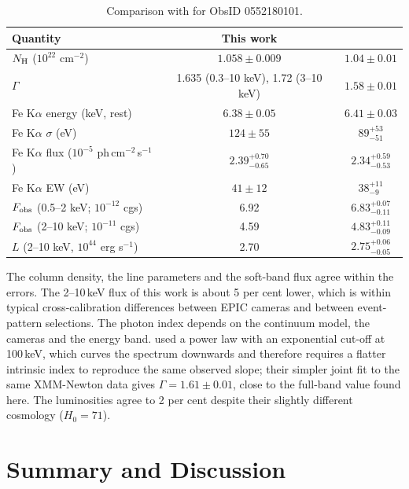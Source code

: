 \documentclass[11pt,a4paper]{article}
\newcommand{\nh}{N_{\rm H}}
\begin{document}
\begin{table}[H]
\centering
\caption{Comparison with \citet{ballo11} for ObsID 0552180101.}
\label{tab:comp}
\small
\begin{tabular}{lcc}
\toprule
Quantity & This work & \citet{ballo11} \\
\midrule
$\nh$ ($10^{22}$ cm$^{-2}$) & $1.058\pm0.009$ & $1.04\pm0.01$ \\
$\Gamma$ & 1.635 (0.3--10 keV), 1.72 (3--10 keV) & $1.58\pm0.01$ \\
Fe K$\alpha$ energy (keV, rest) & $6.38\pm0.05$ & $6.41\pm0.03$ \\
Fe K$\alpha$ $\sigma$ (eV) & $124\pm55$ & $89^{+53}_{-51}$ \\
Fe K$\alpha$ flux ($10^{-5}$ ph\,cm$^{-2}$\,s$^{-1}$) & $2.39^{+0.70}_{-0.65}$ & $2.34^{+0.59}_{-0.53}$ \\
Fe K$\alpha$ EW (eV) & $41\pm12$ & $38^{+11}_{-9}$ \\
$F_{\rm obs}$ (0.5--2 keV; $10^{-12}$ cgs) & 6.92 & $6.83^{+0.07}_{-0.11}$ \\
$F_{\rm obs}$ (2--10 keV; $10^{-11}$ cgs) & 4.59 & $4.83^{+0.11}_{-0.09}$ \\
$L$ (2--10 keV, $10^{44}$ erg s$^{-1}$) & 2.70 & $2.75^{+0.06}_{-0.05}$ \\
\bottomrule
\end{tabular}
\end{table}

The column density, the line parameters and the soft-band flux agree within the errors. The 2--10\,keV flux of this work is about 5 per cent lower, which is within typical cross-calibration differences between EPIC cameras and between event-pattern selections. The photon index depends on the continuum model, the cameras and the energy band. \cite{ballo11} used a power law with an exponential cut-off at 100\,keV, which curves the spectrum downwards and therefore requires a flatter intrinsic index to reproduce the same observed slope; their simpler joint fit to the same XMM-Newton data gives $\Gamma=1.61\pm0.01$, close to the full-band value found here. The luminosities agree to 2 per cent despite their slightly different cosmology ($H_0=71$).

\section{Summary and Discussion}
\end{document}

